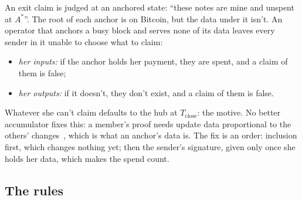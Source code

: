 \documentclass[11pt]{article}
\newcommand{\Tc}{T_{\mathrm{close}}}
\newcommand{\Astar}{A^{*}}
\begin{document}
An exit claim is judged at an anchored state: ``these notes are mine
and unspent at $\Astar$''. The root of each anchor is on Bitcoin, but
the data under it isn't. An operator that anchors a busy block and
serves none of its data leaves every sender in it unable to choose what
to claim:
\begin{itemize}[leftmargin=1.5em]
\item \emph{her inputs:} if the anchor holds her payment, they are
  spent, and a claim of them is false;
\item \emph{her outputs:} if it doesn't, they don't exist, and a claim
  of them is false.
\end{itemize}
Whatever she can't claim defaults to the hub at $\Tc$: the motive. No
better accumulator fixes this: a member's proof needs update data
proportional to the others' changes~\cite{camacho}, which is what an
anchor's data is. The fix is an order: inclusion first, which changes
nothing yet; then the sender's signature, given only once she holds her
data, which makes the spend count.

\subsection{The rules}
\end{document}
